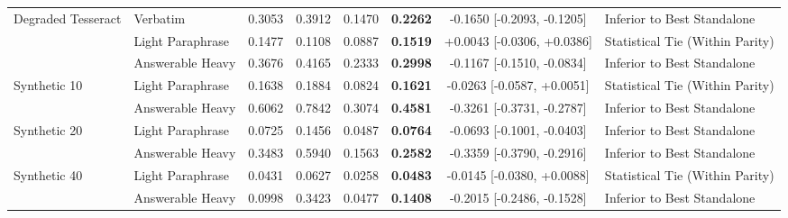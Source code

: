 \begin{table}[t]
\begin{tabular}{llcccccl}
Degraded Tesseract & Verbatim & 0.3053 & 0.3912 & 0.1470 & \textbf{0.2262} & -0.1650 [-0.2093, -0.1205] & Inferior to Best Standalone \\
 & Light Paraphrase & 0.1477 & 0.1108 & 0.0887 & \textbf{0.1519} & +0.0043 [-0.0306, +0.0386] & Statistical Tie (Within Parity) \\
 & Answerable Heavy & 0.3676 & 0.4165 & 0.2333 & \textbf{0.2998} & -0.1167 [-0.1510, -0.0834] & Inferior to Best Standalone \\
Synthetic 10%
 & Light Paraphrase & 0.1638 & 0.1884 & 0.0824 & \textbf{0.1621} & -0.0263 [-0.0587, +0.0051] & Statistical Tie (Within Parity) \\
 & Answerable Heavy & 0.6062 & 0.7842 & 0.3074 & \textbf{0.4581} & -0.3261 [-0.3731, -0.2787] & Inferior to Best Standalone \\
Synthetic 20%
 & Light Paraphrase & 0.0725 & 0.1456 & 0.0487 & \textbf{0.0764} & -0.0693 [-0.1001, -0.0403] & Inferior to Best Standalone \\
 & Answerable Heavy & 0.3483 & 0.5940 & 0.1563 & \textbf{0.2582} & -0.3359 [-0.3790, -0.2916] & Inferior to Best Standalone \\
Synthetic 40%
 & Light Paraphrase & 0.0431 & 0.0627 & 0.0258 & \textbf{0.0483} & -0.0145 [-0.0380, +0.0088] & Statistical Tie (Within Parity) \\
 & Answerable Heavy & 0.0998 & 0.3423 & 0.0477 & \textbf{0.1408} & -0.2015 [-0.2486, -0.1528] & Inferior to Best Standalone \\
\bottomrule
\end{tabular}
\end{table}
